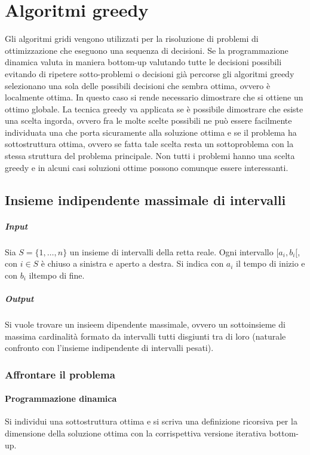 \chapter{Algoritmi greedy}
Gli algoritmi gridi vengono utilizzati per la risoluzione di problemi di ottimizzazione che eseguono una sequenza di decisioni. Se la programmazione dinamica valuta in maniera bottom-up
valutando tutte le decisioni possibili evitando di ripetere sotto-problemi o decisioni gi\`a percorse gli algoritmi greedy selezionano una sola delle possibili decisioni che sembra
ottima, ovvero \`e localmente ottima. In questo caso si rende necessario dimostrare che si ottiene un ottimo globale. La tecnica greedy va applicata se \`e possibile dimostrare che 
esiste una scelta ingorda, ovvero fra le molte scelte possibili ne pu\`o essere facilmente individuata una che porta sicuramente alla soluzione ottima e se il problema ha sottostruttura
ottima, ovvero se fatta tale scelta resta un sottoproblema con la stessa struttura del problema principale. Non tutti i problemi hanno una scelta greedy e in alcuni casi soluzioni ottime
possono comunque essere interessanti.
\section{Insieme indipendente massimale di intervalli}
\paragraph{Input}
Sia $S=\{1, \dots, n\}$ un insieme di intervalli della retta reale. Ogni intervallo $[a_i, b_i[$, con $i\in S$ \`e chiuso a sinistra e aperto a destra. Si indica con $a_i$ il tempo di
inizio e con $b_i$ iltempo di fine. 
\paragraph{Output}
Si vuole trovare un insieem dipendente massimale, ovvero un sottoinsieme di massima cardinalit\`a formato da intervalli tutti disgiunti tra di loro (naturale confronto con l'insieme
indipendente di intervalli pesati).
\subsection{Affrontare il problema}
\subsubsection{Programmazione dinamica}
Si individui una sottostruttura ottima e si scriva una definizione ricorsiva per la dimensione della soluzione ottima con la corrispettiva versione iterativa bottom-up.

